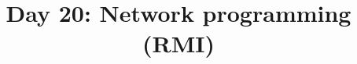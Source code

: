 \documentclass{article}
\begin{document}
\title{Day 20: Network programming (RMI)}
\author{}
\date{}

\maketitle


\end{document}

